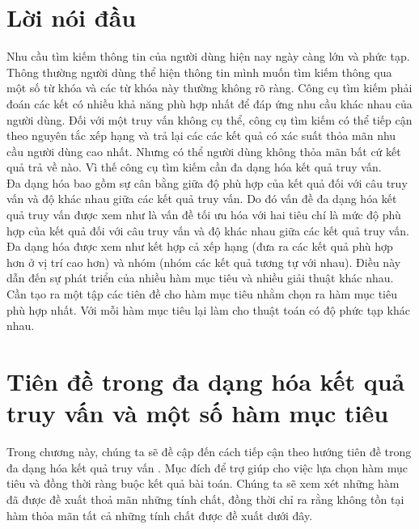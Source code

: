 \documentclass[12pt]{report}
\begin{document}
\newpage
\setcounter{page}{1}

\section*{Lời nói đầu}

Nhu cầu tìm kiếm thông tin của người dùng hiện nay ngày càng lớn và phức tạp. Thông thường người dùng thể hiện thông tin mình muốn tìm kiếm thông qua một số từ khóa và các từ khóa này thường không rõ ràng. Công cụ tìm kiếm phải đoán các kết có nhiều khả năng phù hợp nhất để đáp ứng nhu cầu khác nhau của người dùng. Đối với một truy vấn không cụ thể, công cụ tìm kiếm có thể tiếp cận theo nguyên tắc xếp hạng và trả lại các các kết quả có xác suất thỏa mãn nhu cầu người dùng cao nhất. Nhưng có thể người dùng không thỏa mãn bất cứ kết quả trả về nào. Vì thế 	công cụ tìm kiếm cần đa dạng hóa kết quả truy vấn.\\
Đa dạng hóa bao gồm sự cân bằng giữa độ phù hợp của kết quả đối với câu truy vấn và độ khác nhau giữa các kết quả truy vấn. Do đó vấn đề đa dạng hóa kết quả truy vấn được xem như là vấn đề tối ưu hóa với hai tiêu chí là mức độ phù hợp của kết quả đối với câu truy vấn và độ khác nhau giữa các kết quả truy vấn. Đa dạng hóa được xem như kết hợp cả xếp hạng (đưa ra các kết quả phù hợp hơn ở vị trí cao hơn) và nhóm (nhóm các kết quả tương tự với nhau). Điều này dẫn đến sự phát triển của nhiều hàm mục tiêu và nhiều giải thuật khác nhau.
Cần tạo ra một tập các tiên đề cho hàm mục tiêu nhằm chọn ra hàm mục tiêu phù hợp nhất. Với mỗi hàm mục tiêu lại làm cho thuật toán có độ phức tạp khác nhau.

\newpage


\section{Tiên đề trong đa dạng hóa kết quả truy vấn và một số hàm mục tiêu}
Trong chương này, chúng ta sẽ đề cập đến cách tiếp cận 
theo hướng tiên đề trong đa dạng hóa kết quả truy vấn \cite{diversification}. 
Mục đích để trợ giúp cho việc lựa chọn hàm mục tiêu và đồng thời 
ràng buộc kết quả bài toán.
Chúng ta sẽ xem xét những hàm đã được đề xuất thoả mãn những tính chất, đồng thời chỉ ra rằng không tồn tại hàm thỏa mãn tất cả những tính chất được đề xuất dưới đây. 
\end{document}
